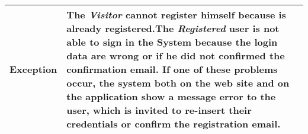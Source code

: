 \begin{table}[H]
\begin{tabular}{|p{3.5cm}|p{10.3cm}|}
    \hline
    \textbf{\large{Exception}} 			& The \emph{Visitor} cannot register himself because is already registered.\newline The \emph{Registered} user                                         is not able to sign in the System because the login data are wrong or if he did not confirmed  the confirmation email. \newline
    										If one of these problems occur, the system both on the web site and on the application show a message error to the user, which is invited to re-insert their credentials or confirm the registration email.\\
    
    \hline
    
    
    \end{tabular}
	
\end{table}
